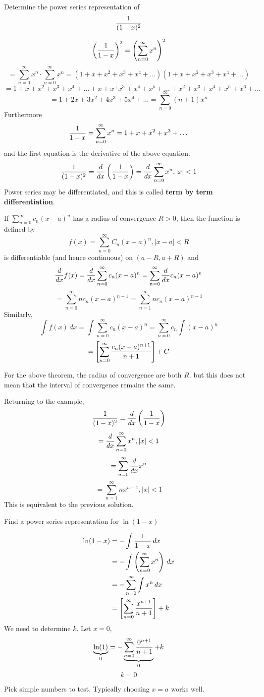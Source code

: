 \documentclass[english, 12pt]{article}
\begin{document}
\begin{exmp}
Determine the power series representation of 
\[ \frac{1}{(1-x)^2}\]
\begin{sol}
\[\left(\frac{1}{1-x}\right)^2 = \left(\sum_{n=0}^\infty x^n \right)^2\]
\[= \sum_{n=0}^\infty x^n \cdot \sum_{n=0}^\infty x^n = (1 + x + x^2 + x^3 + x^4 + \dots )( 1 + x + x^2 + x^3 + x^4 + \dots) \]
\[=1 + x + x^2 + x^3 + x^4 + \dots + x + x^ + x^3 + x^4 + x^5 + \dots + x^2 + x^3 + x^4 + x^5 + x^6 + \dots\]
\[=1 + 2x + 3x^2 + 4x^3 + 5x^4 + \dots = \sum_{n=0}^\infty (n+1) x^n\]
Furthermore 
\[\frac{1}{1-x} = \sum_{n=0}^\infty x^n = 1 + x + x^2 + x^3 + \dots\]
and the first equation is the derivative of the above equation.
\[\frac{1}{(1-x)^2} = \frac{d}{dx} \left( \frac{1}{1-x} \right) = \frac{d}{dx} \sum_{n=0}^\infty x^n, |x| < 1\]
Power series may be differentiated, and this is called \textbf{term by term differentiation}.
\begin{thrm}
If $\sum_{n=0}^\infty c_{n} (x-a)^n$ has a radius of convergence $R > 0$, then the function is defined by
\[ f(x) = \sum_{n=0}^\infty C_{n} (x-a)^n, |x-a| < R\]
is differentiable (and hence continuous) on $(a-R,a+R)$ and
\[\frac{d}{dx} f(x) = \frac{d}{dx} \sum_{n=0}^\infty c_{n} (x-a)^n =  \sum_{n=0}^\infty \frac{d}{dx} c_{n} (x-a)^n  \]
\[ = \sum_{n=0}^\infty n c_{n} (x-a)^{n-1} = \sum_{n=1}^\infty n c_{n} (x-a)^{n-1}\]
Similarly,
\[\int f(x)\,dx = \int \sum_{n=0}^\infty c_{n} (x-a)^n = \sum_{n=0}^\infty c_{n} \int (x-a)^n\]
\[= \left\lbrack \sum_{n=0}^\infty \frac{c_{n} (x-a)^{n+1}}{n+1} \right\rbrack + C\]
\end{thrm}
\begin{note}
For the above theorem, the radius of convergence are both $R$. but this does not mean that the interval of convergence remains the same.
\end{note}
Returning to the example,
\[\frac{1}{(1-x)^2} = \frac{d}{dx} \left( \frac{1}{1-x}\right)\]
\[= \frac{d}{dx} \sum_{n=0}^\infty x^n, |x| < 1\]
\[ = \sum_{n=0}^\infty \frac{d}{dx} x^n\]
\[ = \sum_{n=1}^\infty nx^{n-1},|x| < 1\]
This is equivalent to the previous solution.
\end{sol}
\end{exmp}
\begin{exmp}
Find a power series representation for $\ln(1-x)$
\begin{sol}
\begin{align*}
\ln(1-x) &= - \int \frac{1}{1-x}\,dx\\
&= - \int \left(\sum_{n=0}^\infty x^n \right)\,dx\\
&= - \sum_{n=0}^\infty \int x^n\,dx\\
&= \left\lbrack\sum_{n=0}^\infty \frac{x^{n+1}}{n+1}\right\rbrack + k
\end{align*}
We need to determine $k$. Let $x=0$,
\[\underbrace{\ln(1)}_0 = - \underbrace{\sum_{n=0}^\infty \frac{0^{n+1}}{n+1}}_0 + k\]
\[ k = 0\]
\begin{note}
Pick simple numbers to test. Typically choosing $x=a$ works well.
\end{note}
\end{sol}
\end{exmp}
\end{document}
